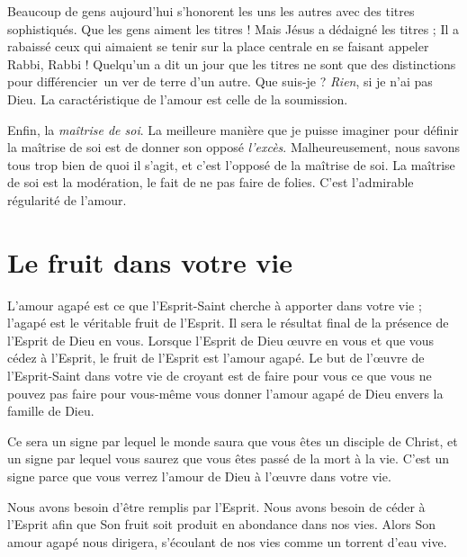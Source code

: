 Beaucoup de gens aujourd'hui s'honorent les uns les autres
 avec des titres sophistiqués. Que les gens aiment les titres !
 Mais Jésus a dédaigné les titres ; Il a rabaissé ceux qui aimaient
 se tenir sur la place centrale en se faisant appeler\frcolon{}
 \Og Rabbi, Rabbi ! \Fg{}
 Quelqu'un a dit un jour que les titres ne sont que des distinctions
 pour différencier~un ver de terre d'un autre. Que suis-je ?
 \emph{Rien}, si je n'ai pas Dieu. La caractéristique de l'amour
 est celle de la soumission.

Enfin, la \emph{maîtrise de soi}. La meilleure manière que je puisse imaginer
 pour définir la maîtrise de soi est de donner son opposé\frcolon{} \emph{l'excès}.
 Malheureusement, nous savons tous trop bien de quoi il s'agit,
 et c'est l'opposé de la maîtrise de soi.
 La maîtrise de soi est la modération, le fait de ne pas faire de folies.
 C'est l'admirable régularité de l'amour.


\section{Le fruit dans votre vie}

L'amour agapé est ce que l'Esprit-Saint cherche à apporter dans votre vie ;
 l'agapé est le véritable fruit de l'Esprit.
 Il sera le résultat final de la présence de l'Esprit de Dieu en vous.
 Lorsque l'Esprit de Dieu œuvre en vous et que vous cédez à l'Esprit,
 le fruit de l'Esprit est l'amour agapé. Le but de l'œuvre de
 l'Esprit-Saint dans votre vie de croyant est de faire pour vous
 ce que vous ne pouvez pas faire pour vous-même\frcolon{}
 vous donner l'amour agapé de Dieu envers la famille de Dieu.

Ce sera un signe par lequel le monde saura que vous êtes un disciple
 de Christ, et un signe par lequel vous saurez que vous êtes passé
 de la mort à la vie. C'est un signe parce que vous verrez
 l'amour de Dieu à l'œuvre dans votre vie.

Nous avons besoin d'être remplis par l'Esprit.
 Nous avons besoin de céder à l'Esprit afin que Son fruit soit produit
 en abondance dans nos vies. Alors Son amour agapé nous dirigera,
 s'écoulant de nos vies comme un torrent d'eau vive.
\closechapter
{}

